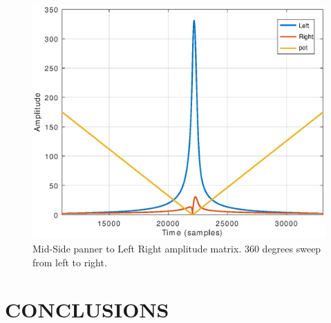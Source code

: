 \documentclass{article}
\begin{document}
\begin{figure}[t]
\centering
\includegraphics[width=1\columnwidth]{lrpanfbpot2}
\caption{Mid-Side panner to Left Right amplitude matrix. 360 degrees sweep from left to right.\label{fig:mspanlr}}
\end{figure}

\vfill\null

\newpage

\section{CONCLUSIONS}
\label{sec:conc}

%
%
%
%

\vfill\null

\newpage


\end{document}
